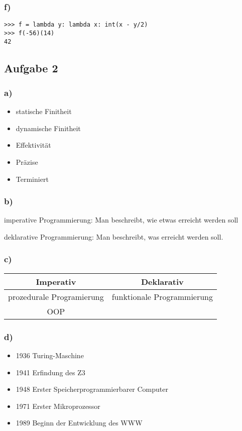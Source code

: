 \documentclass{scrartcl}
\begin{document}
\subsubsection*{f)}
\begin{lstlisting}
>>> f = lambda y: lambda x: int(x - y/2)
>>> f(-56)(14)
42
\end{lstlisting}

\subsection*{Aufgabe 2}
\subsubsection*{a)}
\begin{itemize}
\item statische Finitheit
\item dynamische Finitheit
\item Effektivität
\item Präzise
\item Terminiert
\end{itemize}

\subsubsection*{b)}
imperative Programmierung: Man beschreibt,
 wie
 etwas
erreicht werden soll

deklarative Programmierung: Man beschreibt,
 was
erreicht werden soll.

\subsubsection*{c)}
\begin{tabular}{c|c}
Imperativ & Deklarativ \\
\hline
prozedurale Programierung & funktionale Programmierung\\
OOP & 
\end{tabular}

\subsubsection*{d)}

\begin{itemize}
 \item 1936 Turing-Maschine
 \item 1941 Erfindung des Z3
 \item 1948 Erster Speicherprogrammierbarer Computer
 \item 1971 Erster Mikroprozessor
 \item 1989 Beginn der Entwicklung des WWW
\end{itemize}
\end{document}
